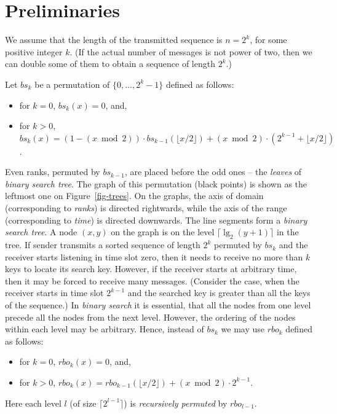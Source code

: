 \documentclass{llncs}
\begin{document}
\section{Preliminaries}
 
We assume that the length of the transmitted sequence is $n=2^k$, for
some positive integer $k$.
(If the actual number of messages is not power of two, then
we can double some of them to obtain a sequence of length $2^k$.)


Let $bs_k$ be a permutation of $\{0,\ldots,2^k-1\}$ defined as follows:
\begin{itemize}
\item for $k=0$, ${bs}_k (x)=0$, and,
\item for $k>0$, ${bs}_{k } (x)  =  (1-(x\bmod 2))\cdot {bs}_{k-1} (\lfloor x / 2 \rfloor) 
                            + (x\bmod 2) \cdot (2^{k-1} + \lfloor x / 2 \rfloor)$.
\end{itemize}
Even ranks, permuted by $bs_{k-1}$, are placed before 
the odd ones -- the {\em leaves} of {\em binary search tree}.
The graph of this permutation (black points) is shown as the leftmost one on Figure~\ref{fig-trees}.
On the graphs, 
the axis of domain (corresponding to {\em ranks}) is directed rightwards, 
while the axis of the range (corresponding to {\em time}) is directed downwards.
The line segments form a {\em binary search tree}.
A node $(x,y)$ on the graph is on the level $\lceil\lg_2(y+1)\rceil$ in the tree. 
If sender transmits a sorted sequence of length $2^k$ permuted by $bs_k$
and the receiver starts listening in time slot zero, then it needs to 
receive no more than $k$ keys to locate its search key.
However, if the receiver starts at arbitrary time, then it may be forced to 
receive many messages.
(Consider the case, when the receiver starts in time slot $2^{k-1}$ and the searched key
is greater than all the keys of the sequence.)
In {\em binary search} it is essential, 
that all the nodes from one level precede all the nodes from the next level.
However, the ordering of the nodes within each level may be arbitrary.  
Hence, instead of $bs_k$ we may use $rbo_k$ defined as follows:
\begin{itemize}
\item for $k=0$,  ${rbo}_k(x) =  0$, and,
\item for $k>0$,   ${rbo}_{k}(x)  =  {rbo}_{k-1} (\lfloor x / 2 \rfloor) 
                         + (x\bmod 2) \cdot 2^{k-1}$.
\end{itemize}
Here each level $l$ (of size $\lceil 2^{l-1}\rceil$) is {\em recursively permuted} by $rbo_{l-1}$.
\end{document}
